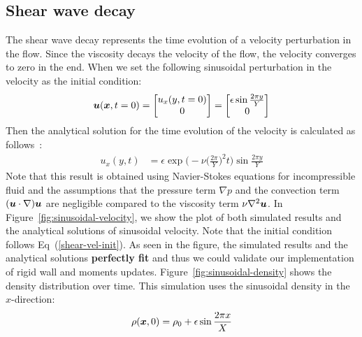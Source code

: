 \subsection{Shear wave decay}
The shear wave decay represents the time evolution of a
velocity perturbation in the flow.
Since the viscosity decays the velocity of the flow,
the velocity converges to zero in the end.
When we set the following sinusoidal perturbation in the velocity
as the initial condition:
\begin{equation}
  \begin{aligned}
    \boldsymbol{u}(\boldsymbol{x}, t = 0) =
    \begin{bmatrix}
      u_x(y, t = 0) \\
      0 \\
    \end{bmatrix}
    =  
    \begin{bmatrix}
      \epsilon \sin \frac{2\pi y}{Y} \\
        0 \\
      \end{bmatrix}
  \end{aligned}
  \label{shear-vel-init}
\end{equation}
Then the analytical solution for the time evolution of 
the velocity is calculated as follows~\cite{fei2018three}:
\begin{equation}
  \begin{aligned}
    u_x(y, t) &= 
    \epsilon \exp\biggl(
      -\nu \biggl(
        \frac{2\pi}{Y}
      \biggr)^2 t\biggr) \sin \frac{2\pi y}{Y}
  \end{aligned}
  \label{sinusoidal-vel-analytical-solution}
\end{equation}
Note that this result is obtained using Navier-Stokes equations for incompressible fluid
and the assumptions that the pressure term $\nabla p$ and
the convection term $(\boldsymbol{u} \cdot \nabla) \boldsymbol{u}$ are negligible 
compared to the viscosity term $\nu \nabla^2 \boldsymbol{u}$.
In Figure~\ref{fig:sinusoidal-velocity}, we show the plot of both
simulated results and the analytical solutions of sinusoidal velocity.
Note that the initial condition follows Eq~(\ref{shear-vel-init}). 
As seen in the figure, the simulated results and the analytical solutions
{\bf perfectly fit} and thus we could validate our implementation of
rigid wall and moments updates.
Figure~\ref{fig:sinusoidal-density} shows the density distribution
over time.
This simulation uses the sinusoidal density in the $x$-direction:
\begin{equation}
\begin{aligned}
  \rho(\boldsymbol{x}, 0) = \rho_0 + \epsilon \sin \frac{2 \pi x}{X}
\end{aligned}
\end{equation}

